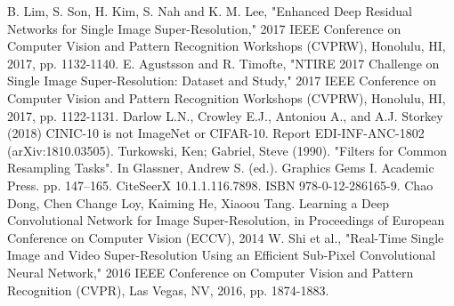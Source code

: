\documentclass[conference]{IEEEtran}
\begin{document}
\begin{thebibliography}{00}
   B. Lim, S. Son, H. Kim, S. Nah and K. M. Lee, "Enhanced Deep Residual Networks for Single Image Super-Resolution," 2017 IEEE Conference on Computer Vision and Pattern Recognition Workshops (CVPRW), Honolulu, HI, 2017, pp. 1132-1140.
   E. Agustsson and R. Timofte, "NTIRE 2017 Challenge on Single Image Super-Resolution: Dataset and Study," 2017 IEEE Conference on Computer Vision and Pattern Recognition Workshops (CVPRW), Honolulu, HI, 2017, pp. 1122-1131.
   Darlow L.N., Crowley E.J., Antoniou A., and A.J. Storkey (2018) CINIC-10 is not ImageNet or CIFAR-10. Report EDI-INF-ANC-1802 (arXiv:1810.03505).
   Turkowski, Ken; Gabriel, Steve (1990). "Filters for Common Resampling Tasks". In Glassner, Andrew S. (ed.). Graphics Gems I. Academic Press. pp. 147–165. CiteSeerX 10.1.1.116.7898. ISBN 978-0-12-286165-9.
   Chao Dong, Chen Change Loy, Kaiming He, Xiaoou Tang. Learning a Deep Convolutional Network for Image Super-Resolution, in Proceedings of European Conference on Computer Vision (ECCV), 2014
   W. Shi et al., "Real-Time Single Image and Video Super-Resolution Using an Efficient Sub-Pixel Convolutional Neural Network," 2016 IEEE Conference on Computer Vision and Pattern Recognition (CVPR), Las Vegas, NV, 2016, pp. 1874-1883.
\end{thebibliography}
\end{document}

